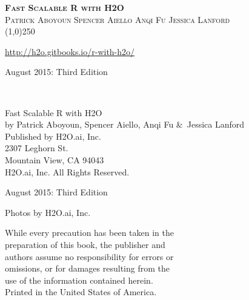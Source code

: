 







\thispagestyle{empty} %

\begin{center}
\textsc{\Large\bf{Fast Scalable R with H2O}}
\\
\bigskip
\textsc{\small{Patrick Aboyoun \hspace{40pt} Spencer Aiello \hspace{40pt} Anqi Fu \hspace{40pt} Jessica Lanford}}
\\
\bigskip
\line(1,0){250}  %

{\url{http://h2o.gitbooks.io/r-with-h2o/}}

\bigskip
August 2015: Third Edition 
\\%
\bigskip
\end{center}

{\raggedright\vfill\ 

Fast Scalable R with H2O\\
  by Patrick Aboyoun,  Spencer Aiello, Anqi Fu \&\ Jessica Lanford\\
\bigskip
  Published by H2O.ai, Inc. \\
2307 Leghorn St. \\
Mountain View, CA 94043\\
\bigskip
{} H2O.ai, Inc. All Rights Reserved. 
\bigskip

August 2015: Third Edition
\bigskip

Photos by \textcopyright H2O.ai, Inc. 
\bigskip

While every precaution has been taken in the\\
preparation of this book, the publisher and\\
authors assume no responsibility for errors or\\
omissions, or for damages resulting from the\\
use of the information contained herein.\\
\bigskip
Printed in the United States of America. 


}\par

\newpage
\tableofcontents



